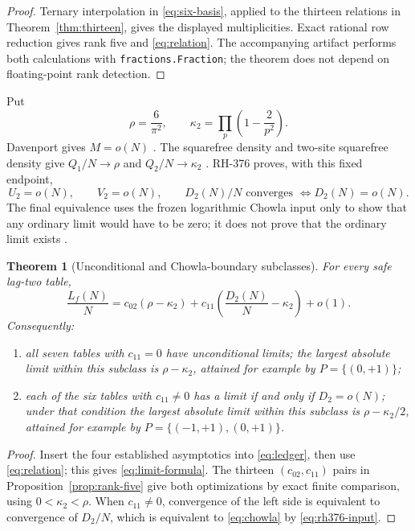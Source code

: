 \documentclass[11pt]{article}
\newtheorem{theorem}{Theorem}[section]
\theoremstyle{definition}
\theoremstyle{remark}
\newcommand{\rhoone}{\rho}
\newcommand{\kappatwo}{\kappa_2}
\begin{document}
\begin{proof}
Ternary interpolation in \eqref{eq:six-basis}, applied to the thirteen
relations in Theorem~\ref{thm:thirteen}, gives the displayed multiplicities.
Exact rational row reduction gives rank five and \eqref{eq:relation}.  The
accompanying artifact performs both calculations with
\texttt{fractions.Fraction}; the theorem does not depend on floating-point
rank detection.
\end{proof}

Put
\begin{equation}
 \rhoone=\frac6{\pi^2},\qquad
 \kappatwo=\prod_p\left(1-\frac2{p^2}\right).
 \label{eq:constants}
\end{equation}
Davenport gives $M=o(N)$ \cite{Davenport1937}.  The squarefree density and
two-site squarefree density give
$Q_1/N\to\rhoone$ and $Q_2/N\to\kappatwo$
\cite{Mirsky1948}.  RH-376 proves, with this fixed endpoint,
\begin{equation}
        U_2=o(N),\qquad V_2=o(N),\qquad
        D_2(N)/N\text{ converges }\Longleftrightarrow D_2(N)=o(N).
        \label{eq:rh376-input}
\end{equation}
The final equivalence uses the frozen logarithmic Chowla input only to show
that any ordinary limit would have to be zero; it does not prove that the
ordinary limit exists \cite{RH376}.

\begin{theorem}[Unconditional and Chowla-boundary subclasses]
\label{thm:lag-limits}
For every safe lag-two table,
\begin{equation}
 \frac{L_f(N)}N
 =c_{02}(\rhoone-\kappatwo)
  +c_{11}\left(\frac{D_2(N)}N-\kappatwo\right)+o(1).
 \label{eq:limit-formula}
\end{equation}
Consequently:
\begin{enumerate}
\item all seven tables with $c_{11}=0$ have unconditional limits; the
largest absolute limit within this subclass is
$\rhoone-\kappatwo$, attained for example by $P=\{(0,+1)\}$;
\item each of the six tables with $c_{11}\ne0$ has a limit if and only if
$D_2=o(N)$; under that condition the largest absolute limit within this
subclass is $\rhoone-\kappatwo/2$, attained for example by
$P=\{(-1,+1),(0,+1)\}$.
\end{enumerate}
\end{theorem}

\begin{proof}
Insert the four established asymptotics into \eqref{eq:ledger}, then use
\eqref{eq:relation}; this gives \eqref{eq:limit-formula}.  The thirteen
$(c_{02},c_{11})$ pairs in Proposition~\ref{prop:rank-five} give both
optimizations by exact finite comparison, using
$0<\kappatwo<\rhoone$.  When $c_{11}\ne0$, convergence
of the left side is equivalent to convergence of $D_2/N$, which is
equivalent to \eqref{eq:chowla} by \eqref{eq:rh376-input}.
\end{proof}
\end{document}
